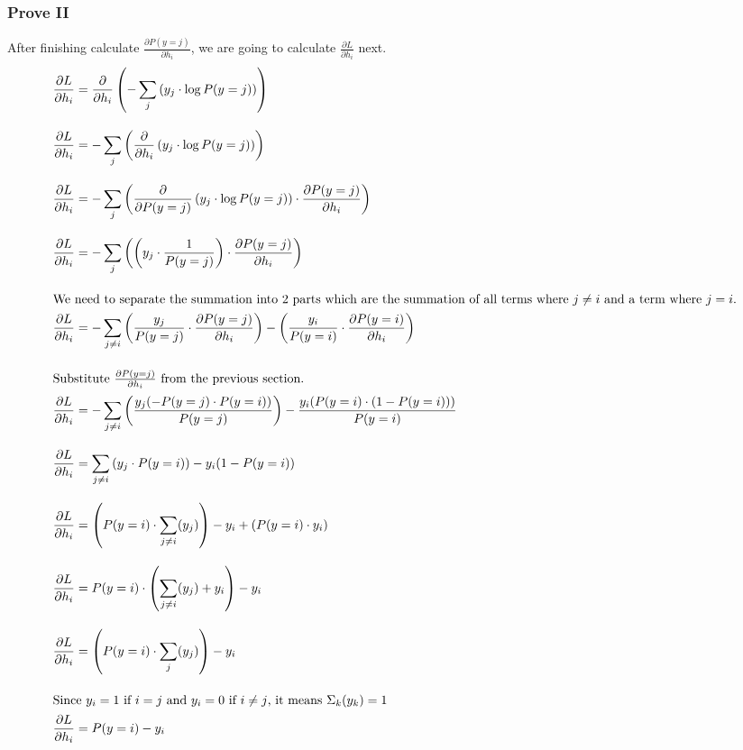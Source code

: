 \documentclass[12pt, a4paper]{article}
\begin{document}
    \pagebreak

            \subsubsection{Prove II}
                After finishing calculate $\frac{\partial P(y=j)}{\partial h_i}$, we are going to calculate $\frac{\partial L}{\partial h_i}$ next.
                \begin{align*}
                    \frac{\partial L}{\partial h_i} &= \frac{\partial}{\partial h_i} \left( -\sum_j \left( y_j \cdot \log P(y=j) \right) \right) \\[1em]
                    \frac{\partial L}{\partial h_i} &= -\sum_j \left( \frac{\partial}{\partial h_i} \left( y_j \cdot \log P(y=j) \right) \right) \\[1em]
                    \frac{\partial L}{\partial h_i} &= -\sum_j \left(
                        \frac{\partial}{\partial P(y=j)} \left( y_j \cdot \log P(y=j) \right)
                        \cdot \frac{\partial P(y=j)}{\partial h_i}
                    \right) \\[1em]
                    \frac{\partial L}{\partial h_i} &= -\sum_j \left(
                        \left( y_j \cdot \frac{1}{P(y=j)} \right)
                        \cdot \frac{\partial P(y=j)}{\partial h_i}
                    \right) \\[1em]
                    \intertext{We need to separate the summation into 2 parts which are the summation of all terms where $j \neq i$ and a term where $j = i$.}
                    \frac{\partial L}{\partial h_i} &= -\sum_{j \neq i} \left(
                        \frac{y_j}{P(y=j)} \cdot \frac{\partial P(y=j)}{\partial h_i}
                    \right)
                    - \left(
                        \frac{y_i}{P(y=i)} \cdot \frac{\partial P(y=i)}{\partial h_i}
                    \right) \\[1em]
                    \intertext{Substitute $\frac{\partial P(y=j)}{\partial h_i}$ from the previous section.}
                    \frac{\partial L}{\partial h_i} &= -\sum_{j \neq i} \left(
                        \frac{y_j (-P(y=j) \cdot P(y=i))}{P(y=j)}
                    \right)
                    - \frac{y_i (P(y=i) \cdot (1 - P(y=i)))}{P(y=i)} \\[1em]
                    \frac{\partial L}{\partial h_i} &= \sum_{j \neq i} \left( y_j \cdot P(y=i) \right) - y_i(1 - P(y=i)) \\[1em]
                    \frac{\partial L}{\partial h_i} &= \left( P(y=i) \cdot \sum_{j \neq i} (y_j) \right) - y_i + (P(y=i) \cdot y_i) \\[1em]
                    \frac{\partial L}{\partial h_i} &= P(y=i) \cdot \left( \sum_{j \neq i} (y_j) + y_i \right) - y_i \\[1em]
                    \frac{\partial L}{\partial h_i} &= \left( P(y=i) \cdot \sum_{j} (y_j) \right) - y_i \\[1em]
                    \intertext{Since $y_i = 1$ if $i = j$ and $y_i = 0$ if $i \neq j$, it means $\Sigma_k (y_k) = 1$}
                    \frac{\partial L}{\partial h_i} &= P(y=i) - y_i
                \end{align*}
\end{document}

